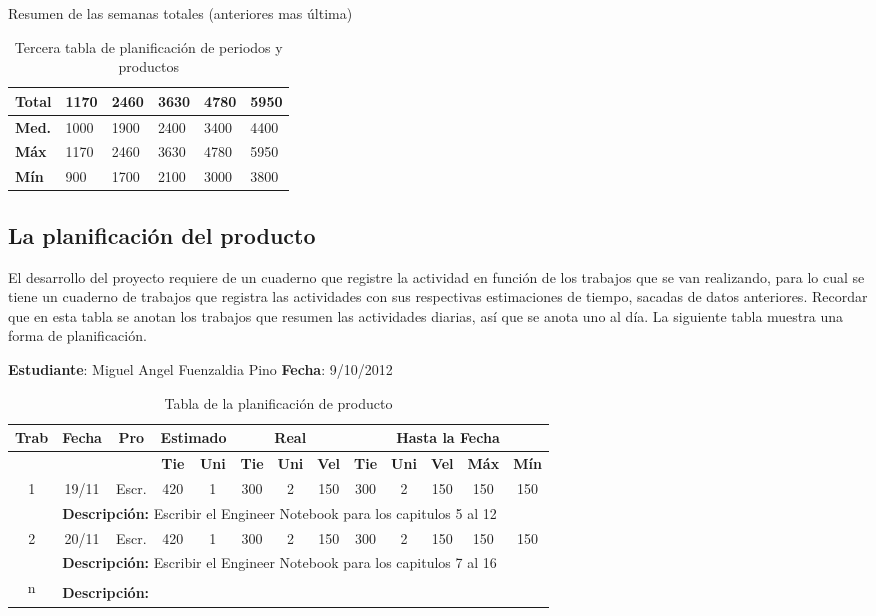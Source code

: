 \documentclass[a4paper,12pt,openany,oneside]{book}
\begin{document}
Resumen de las semanas totales (anteriores mas última)
\begin{table}[!ht]
\begin{tabular}{| l | l | l | l | l | l |}
\hline
\textbf{Total} & 1170 & 2460 & 3630 & 4780 & 5950 \\
\hline
\textbf{Med.} & 1000 & 1900 & 2400 & 3400 & 4400 \\
\hline
\textbf{Máx} & 1170 & 2460 & 3630 & 4780 & 5950 \\
\hline
\textbf{Mín} & 900 & 1700 & 2100 & 3000 & 3800 \\
\hline
\end{tabular}
\caption{Tercera tabla de planificación de periodos y productos}
\end{table}
\subsection{La planificación del producto}
El desarrollo del proyecto requiere de un cuaderno que registre la actividad en función de los trabajos que se van realizando, para lo cual se tiene un cuaderno de trabajos que registra las actividades con sus respectivas estimaciones de tiempo, sacadas de datos anteriores. Recordar que en esta tabla se anotan los trabajos que resumen las actividades diarias, así que se anota uno al día. La siguiente tabla muestra una forma de planificación.
\newpage
\begin{table}[!ht]
\textbf{Estudiante}: Miguel Angel Fuenzaldia Pino     \textbf{Fecha}: 9/10/2012\\
\begin{tabular}{|c|c|c|c|c|c|c|c|c|c|c|c|c|}
\hline
\textbf{Trab} & \textbf{Fecha} & \textbf{Pro} & \multicolumn{2}{|c|}{\textbf{Estimado}} & \multicolumn{3}{|c|}{\textbf{Real}} & \multicolumn{5}{|c|}{\textbf{Hasta la Fecha}} \\
\hline
 & & & \textbf{Tie} & \textbf{Uni} & \textbf{Tie} & \textbf{Uni} & \textbf{Vel} & \textbf{Tie} & \textbf{Uni} & \textbf{Vel} & \textbf{Máx} & \textbf{Mín} \\
\hline
\multirow{2}{*}{1} & 19/11 & Escr. & 420 & 1 & 300 & 2 & 150 & 300 & 2 & 150 & 150 & 150 \\
\cline{2-13} & \multicolumn{12}{|l|}{\textbf{Descripción:} Escribir el Engineer Notebook para los capitulos 5 al 12}\\
\hline
\multirow{2}{*}{2} & 20/11 & Escr. & 420 & 1 & 300 & 2 & 150 & 300 & 2 & 150 & 150 & 150 \\
\cline{2-13} & \multicolumn{12}{|l|}{\textbf{Descripción:} Escribir el Engineer Notebook para los capitulos 7 al 16}\\
\hline
\multirow{2}{*}{n} & & & & & & & & & & & & \\
\cline{2-13} & \multicolumn{12}{|l|}{\textbf{Descripción:}}\\
\hline
\end{tabular}
\caption{Tabla de la planificación de producto}
\end{table}
\end{document}
